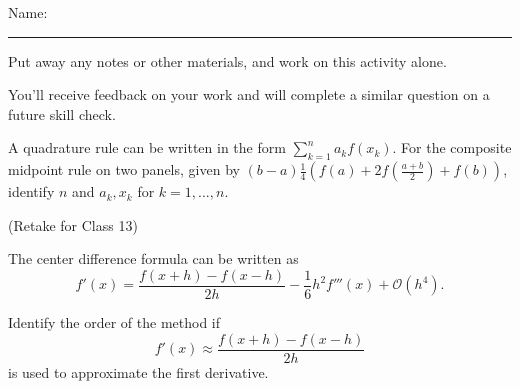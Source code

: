 \documentclass[12pt,letterpaper,noanswers]{exam}
\begin{document}
 \pdfpageheight 11in 
  \pdfpagewidth 8.5in

\noindent Name: \rule{2.5in}{0.5pt}

\noindent Put away any notes or other materials, and work on this activity alone.

\noindent You'll receive feedback on your work and will complete a similar question on a future skill check.


\begin{questions}
\item 
A quadrature rule can be written in the form $\sum\limits_{k=1}^n a_k f(x_k)$. For the composite midpoint rule on two panels, given by $( b-a)\frac{1}{4}\left(f(a)+2f(\frac{a+b}{2})+f(b)\right)$, identify $n$ and $a_k, x_k$ for $k=1,...,n$.
\vspace{6.5cm}

\item (Retake for Class 13)

The center difference formula can be written as \[f'(x) = \dfrac{f(x+h)-f(x-h)}{2h} - \dfrac{1}{6}h^2 f'''(x) + \mathcal{O}(h^4).\]  

Identify the order of the method if 
\[f'(x) \approx  \dfrac{f(x+h)-f(x-h)}{2h}\]
is used to approximate the first derivative.

\end{questions}
\end{document}
